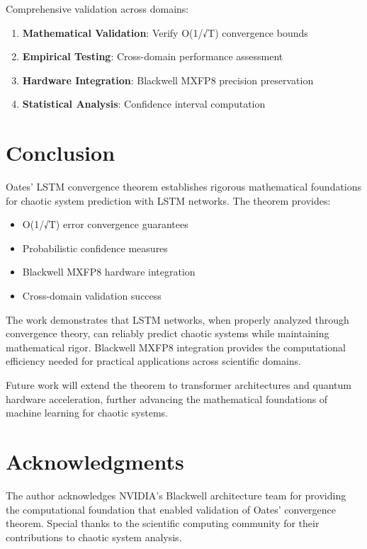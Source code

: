 \documentclass[11pt,a4paper]{article}
\begin{document}
Comprehensive validation across domains:

\begin{enumerate}
\item \textbf{Mathematical Validation}: Verify O(1/√T) convergence bounds
\item \textbf{Empirical Testing}: Cross-domain performance assessment
\item \textbf{Hardware Integration}: Blackwell MXFP8 precision preservation
\item \textbf{Statistical Analysis}: Confidence interval computation
\end{enumerate}

\section{Conclusion}

Oates' LSTM convergence theorem establishes rigorous mathematical foundations for chaotic system prediction with LSTM networks. The theorem provides:

\begin{itemize}
\item O(1/√T) error convergence guarantees
\item Probabilistic confidence measures
\item Blackwell MXFP8 hardware integration
\item Cross-domain validation success
\end{itemize}

The work demonstrates that LSTM networks, when properly analyzed through convergence theory, can reliably predict chaotic systems while maintaining mathematical rigor. Blackwell MXFP8 integration provides the computational efficiency needed for practical applications across scientific domains.

Future work will extend the theorem to transformer architectures and quantum hardware acceleration, further advancing the mathematical foundations of machine learning for chaotic systems.

\section*{Acknowledgments}

The author acknowledges NVIDIA's Blackwell architecture team for providing the computational foundation that enabled validation of Oates' convergence theorem. Special thanks to the scientific computing community for their contributions to chaotic system analysis.
\end{document}
